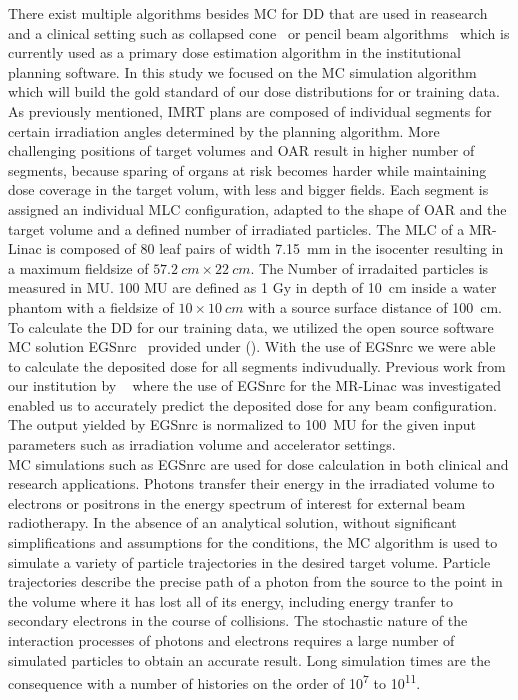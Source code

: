 There exist multiple algorithms besides \acs{MC} for \acs{DD} that are used in reasearch and a clinical setting such as collapsed cone~\cite{ahnesjo_collapsed_1989} or pencil beam algorithms~\cite{mohan_differential_1986} which is currently used as a primary dose estimation algorithm in the institutional planning software.
In this study we focused on the \acs{MC} simulation algorithm which will build the gold standard of our dose distributions for or training data.\\
As previously mentioned, \acs{IMRT} plans are composed of individual segments for certain irradiation angles determined by the planning algorithm.
More challenging positions of target volumes and \acs{OAR} result in higher number of segments, because sparing of organs at risk becomes harder while maintaining dose coverage in the target volum, with less and bigger fields. 
Each segment is assigned an individual \acs{MLC} configuration, adapted to the shape of \acs{OAR} and the target volume and a defined number of irradiated particles.
The \acs{MLC} of a MR-Linac is composed of 80 leaf pairs of width 7.15~mm in the isocenter resulting in a maximum fieldsize of $57.2~cm \times 22~cm$.
The Number of irradaited particles is measured in \ac{MU}.
100 \acs{MU} are defined as 1 Gy in depth of 10~cm inside a water phantom with a fieldsize of $10 \times 10~cm$ with a source surface distance of 100~cm.\\
To calculate the \acs{DD} for our training data, we utilized the open source software \acs{MC} solution EGSnrc~\cite{noauthor_nrc-cnrcegsnrc_2021} provided under ().
With the use of EGSnrc we were able to calculate the deposited dose for all segments indivudually. 
Previous work from our institution by \citeauthor{friedel_development_2019}~\cite{friedel_development_2019} where the use of EGSnrc for the MR-Linac was investigated enabled us to accurately predict the deposited dose for any beam configuration. 
The output yielded by EGSnrc is normalized to 100~\acs{MU} for the given input parameters such as irradiation volume and accelerator settings.\\

\acs{MC} simulations such as EGSnrc are used for dose calculation in both clinical and research applications.
Photons transfer their energy in the irradiated volume to electrons or positrons in the energy spectrum of interest for external beam radiotherapy. 
In the absence of an analytical solution, without significant simplifications and assumptions for the conditions, the \acs{MC} algorithm is used to simulate a variety of particle trajectories in the desired target volume.
Particle trajectories describe the precise path of a photon from the source to the point in the volume where it has lost all of its energy, including energy tranfer to secondary electrons in the course of collisions.
The stochastic nature of the interaction processes of photons and electrons requires a large number of simulated particles to obtain an accurate result. 
Long simulation times are the consequence with a number of histories on the order of 10\textsuperscript{7} to 10\textsuperscript{11}.